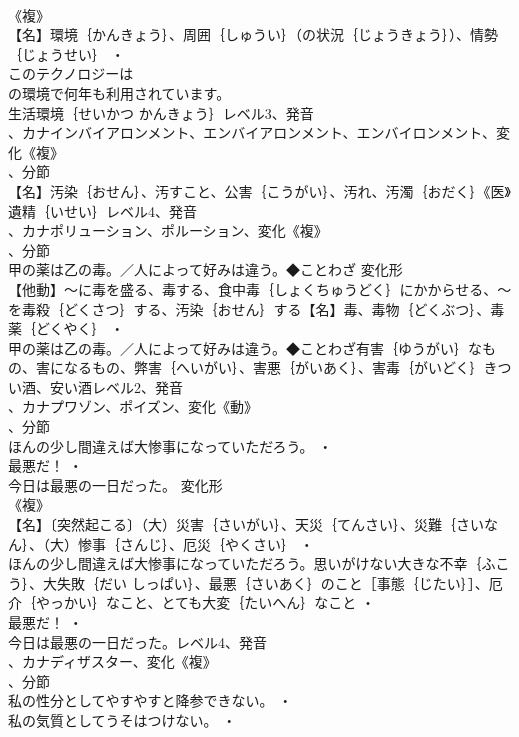\documentclass[8pt]{extreport}
\begin{document}
\begin{CJK}{UTF8}{min}
\\	《複》
\\	【名】環境｛かんきょう｝、周囲｛しゅうい｝（の状況｛じょうきょう｝）、情勢｛じょうせい｝ ・
\\	このテクノロジーは
\\	の環境で何年も利用されています。
\\	生活環境｛せいかつ かんきょう｝レベル3、発音
\\	、カナインバイアロンメント、エンバイアロンメント、エンバイロンメント、変化《複》
\\	、分節
\\	【名】汚染｛おせん｝、汚すこと、公害｛こうがい｝、汚れ、汚濁｛おだく｝《医》遺精｛いせい｝レベル4、発音
\\	、カナポリューション、ポルーション、変化《複》
\\	、分節
\\	甲の薬は乙の毒。／人によって好みは違う。◆ことわざ	変化形 
\\	【他動】～に毒を盛る、毒する、食中毒｛しょくちゅうどく｝にかからせる、～を毒殺｛どくさつ｝する、汚染｛おせん｝する【名】毒、毒物｛どくぶつ｝、毒薬｛どくやく｝ ・
\\	甲の薬は乙の毒。／人によって好みは違う。◆ことわざ有害｛ゆうがい｝なもの、害になるもの、弊害｛へいがい｝、害悪｛がいあく｝、害毒｛がいどく｝きつい酒、安い酒レベル2、発音
\\	、カナプワゾン、ポイズン、変化《動》
\\	、分節
\\	ほんの少し間違えば大惨事になっていただろう。 ・
\\	最悪だ！ ・
\\	今日は最悪の一日だった。	変化形 
\\	《複》
\\	【名】〔突然起こる〕（大）災害｛さいがい｝、天災｛てんさい｝、災難｛さいなん｝、（大）惨事｛さんじ｝、厄災｛やくさい｝ ・
\\	ほんの少し間違えば大惨事になっていただろう。思いがけない大きな不幸｛ふこう｝、大失敗｛だい しっぱい｝、最悪｛さいあく｝のこと［事態｛じたい｝］、厄介｛やっかい｝なこと、とても大変｛たいへん｝なこと ・
\\	最悪だ！ ・
\\	今日は最悪の一日だった。レベル4、発音
\\	、カナディザスター、変化《複》
\\	、分節
\\	私の性分としてやすやすと降参できない。 ・
\\	私の気質としてうそはつけない。 ・

\end{CJK}
\end{document}
